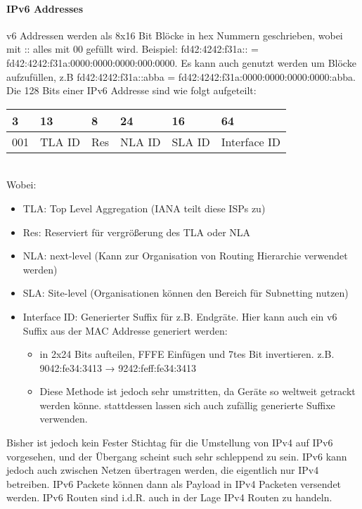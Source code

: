 		\paragraph{IPv6 Addresses}
			v6 Addressen werden als 8x16 Bit Blöcke in hex Nummern geschrieben, wobei mit :: alles mit 00 gefüllt wird. Beispiel: fd42:4242:f31a:: = fd42:4242:f31a:0000:0000:0000:000:0000. Es kann auch genutzt werden um Blöcke aufzufüllen, z.B fd42:4242:f31a::abba = fd42:4242:f31a:0000:0000:0000:0000:abba. Die 128 Bits einer IPv6 Addresse sind wie folgt aufgeteilt:
			\begin{table}[ht]
				\centering
				\begin{tabular}{llllll}
				3 &
				  13 &
				  8 &
				  24 &
				  16 &
				  64 \\ \hline
				\multicolumn{1}{|l|}{001} &
				  \multicolumn{1}{l|}{TLA ID} &
				  \multicolumn{1}{l|}{Res} &
				  \multicolumn{1}{l|}{NLA ID} &
				  \multicolumn{1}{l|}{SLA ID} &
				  \multicolumn{1}{l|}{Interface ID} \\ \hline
				\end{tabular}
			\end{table} \\ 
			Wobei:
			\begin{itemize}
				\item TLA: Top Level Aggregation (IANA teilt diese ISPs zu)
				\item Res: Reserviert für vergrößerung des TLA oder NLA
				\item NLA: next-level (Kann zur Organisation von Routing Hierarchie verwendet werden)
				\item SLA: Site-level (Organisationen können den Bereich für Subnetting nutzen)
				\item Interface ID: Generierter Suffix für z.B. Endgräte. Hier kann auch ein v6 Suffix aus der MAC Addresse generiert werden: 
				\begin{itemize}
					\item in 2x24 Bits aufteilen, FFFE Einfügen und 7tes Bit invertieren. z.B. 9042:fe34:3413 → 9242:feff:fe34:3413
					\item Diese Methode ist jedoch sehr umstritten, da Geräte so weltweit getrackt werden könne. stattdessen lassen sich auch zufällig generierte Suffixe verwenden.
				\end{itemize} 
			\end{itemize}

			Bisher ist jedoch kein Fester Stichtag für die Umstellung von IPv4 auf IPv6 vorgesehen, und der Übergang scheint such sehr schleppend zu sein. IPv6 kann jedoch auch zwischen Netzen übertragen werden, die eigentlich nur IPv4 betreiben. IPv6 Packete können dann als Payload in IPv4 Packeten versendet werden. IPv6 Routen sind i.d.R. auch in der Lage IPv4 Routen zu handeln. 

